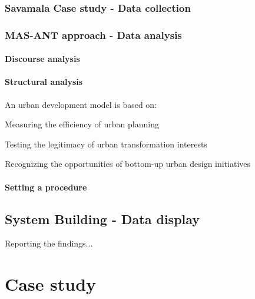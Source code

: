 \documentclass[11pt]{report}
\begin{document}
\subsection{Savamala Case study - Data collection} \label{sec:predis}

\subsection{MAS-ANT approach - Data analysis}

\subsubsection{Discourse analysis}
\subsubsection{Structural analysis}

An urban development model is based on:

Measuring the efficiency of urban planning

Testing the legitimacy of urban transformation interests

Recognizing the opportunities of bottom-up urban design initiatives


\subsubsection{Setting a procedure}

\section{System Building - Data display}

Reporting the findings...


\chapter{Case study}

\end{document}

